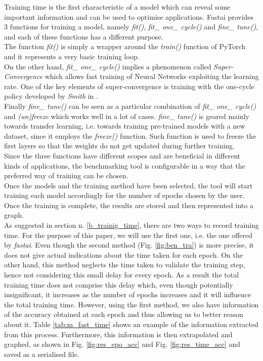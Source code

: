 Training time is the first characteristic of a model which can reveal some important information and can be used to optimise applications. 
Fastai provides 3 functions for training a model, namely \textit{fit()}, \textit{fit\_ one\_ cycle()} and \textit{fine\_ tune()}, and each of these functions has a different purpose.\\
The function \textit{fit()} is simply a wrapper around the \textit{train()} function of PyTorch and it represents a very basic training loop.\cite{fastaidocs} \\
On the other hand, \textit{fit\_ one\_ cycle()} implies a phenomenon called \textit{Super-Convergence} which allows fast training of Neural Networks exploiting the learning rate. \cite{DBLP:journals/corr/abs-1708-07120}
One of the key elements of super-convergence is training with the one-cycle policy developed by \textit{Smith} in \cite{DBLP:journals/corr/abs-1803-09820}. \cite{DBLP:journals/corr/abs-1708-07120}\\
Finally \textit{fine\_ tune()} can be seen as a particular combination of \textit{fit\_ one\_ cycle()} and \textit{(un)freeze} which works well in a lot of cases. \textit{fine\_ tune()} is geared mainly towards transfer learning, i.e. towards training pre-trained models with a new dataset, since it employs the \textit{freeze()} function. Such function is used to freeze the first layers so that the weights do not get updated during further training.\cite{fastaidocs}\\
Since the three functions have different scopes and are beneficial in different kinds of applications, the benchmarking tool is configurable in a way that the preferred way of training can be chosen. \\
Once the models and the training method have been selected, the tool will start training each model accordingly for the number of epochs chosen by the user. Once the training is complete, the results are stored and then represented into a graph. \\
As suggested in section n. \ref{b_trainig_time}, there are two ways to record training time. For the purpose of this paper, we will use the first one, i.e. the one offered by \textit{fastai}. Even though the second method (Fig. \ref{fig:ben_tra}) is more precise, it does not give actual indications about the time taken for each epoch. On the other hand, this method neglects the time taken to validate the training step, hence not considering this small delay for every epoch. As a result the total training time does not comprise this delay which, even though potentially insignificant, it increases as the number of epochs increases and it will influence the total training time. However, using the first method, we also have information of the accuracy obtained at each epoch
and thus allowing us to better reason about it. Table \ref{tab:m_fast_time} shows an example of the information extracted from this process. Furthermore, this information is then extrapolated and graphed, as shown in Fig. \ref{fig:res_epo_acc} and Fig. \ref{fig:res_time_acc} and saved as a serialised file. 




